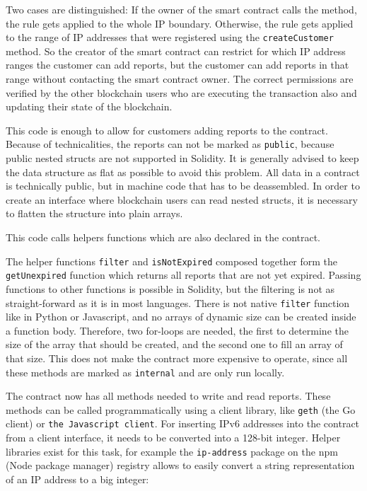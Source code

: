 

Two cases are distinguished: If the owner of the smart contract calls the method, the rule gets applied to the whole IP boundary. Otherwise, the rule gets applied to the range of IP addresses that were registered using the \texttt{createCustomer} method. So the creator of the smart contract can restrict for which IP address ranges the customer can add reports, but the customer can add reports in that range without contacting the smart contract owner. The correct permissions are verified by the other blockchain users who are executing the transaction also and updating their state of the blockchain.

This code is enough to allow for customers adding reports to the contract. Because of technicalities, the reports can not be marked as \texttt{public}, because public nested structs are not supported in Solidity. It is generally advised to keep the data structure as flat as possible to avoid this problem.
All data in a contract is technically public, but in machine code that has to be deassembled. In order to create an interface where blockchain users can read nested structs, it is necessary to flatten the structure into plain arrays.



This code calls helpers functions which are also declared in the contract.



The helper functions \texttt{filter} and \texttt{isNotExpired} composed together form the \texttt{getUnexpired} function which returns all reports that are not yet expired. Passing functions to other functions is possible in Solidity, but the filtering is not as straight-forward as it is in most languages. There is not native \texttt{filter} function like in Python or Javascript, and no arrays of dynamic size can be created inside a function body. Therefore, two for-loops are needed, the first to determine the size of the array that should be created, and the second one to fill an array of that size. This does not make the contract more expensive to operate, since all these methods are marked as \texttt{internal} and are only run locally.

The contract now has all methods needed to write and read reports. These methods can be called programmatically using a client library, like \texttt{geth} (the Go client) or \texttt{the Javascript client}. For inserting IPv6 addresses into the contract from a client interface, it needs to be converted into a 128-bit integer. Helper libraries exist for this task, for example the \texttt{ip-address} package on the npm (Node package manager) registry allows to easily convert a string representation of an IP address to a big integer:

